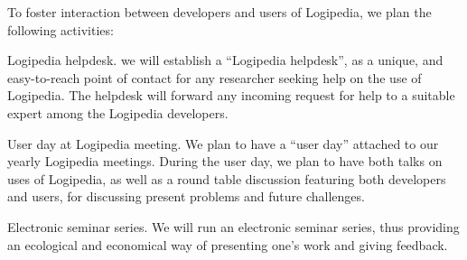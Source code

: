\begin{workpackage}[id=dissemination,type=MGT,
  short={Dissemination},
  title={Dissemination, communication and exploitation},
  lead=Inr,InrRM=12,BirRM=4,IrtRM=4,ImtRM=2,StrRM=2,ZibRM=14,EduRM=12]
\begin{tasklist}
  \begin{task}[id=researchers-club,
      title=Expanding the use of Logipedia in research,
      lead=Bir,BirRM=2,wphases=1-48!.05]
     To foster interaction between developers and users of Logipedia, we plan the following activities:
    \begin{compactitem}
     \item Logipedia helpdesk.
    we will establish a ``Logipedia helpdesk'', as a unique, and easy-to-reach point of contact for any researcher seeking help on the use of Logipedia.
     The helpdesk will forward any incoming request for help to a suitable expert among the Logipedia developers.
     \item User day at Logipedia meeting.
     We plan to have a ``user day'' attached to our yearly Logipedia meetings.
     During the user day, we plan to have both talks on uses of Logipedia, as well as a round table discussion featuring both developers and users, for discussing present problems and future challenges.
     \item Electronic seminar series.
     We will run an electronic seminar series, thus providing an ecological and economical way of presenting one's work and giving feedback.
    \end{compactitem}
%


\end{task}
\end{tasklist}
\end{workpackage}
